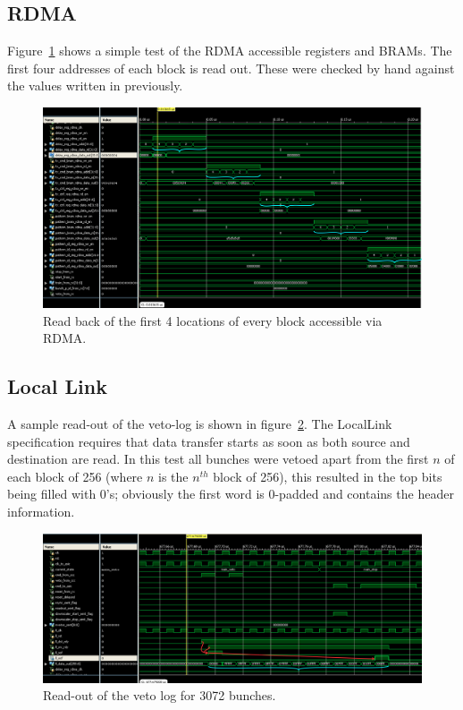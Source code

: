 \subsection{RDMA} %
\label{sec:rdma}
Figure~\ref{fig:isim_rdma} shows a simple test of the RDMA accessible registers and BRAMs. The first four addresses of each block is read out. These were checked by hand against the values written in previously.
\begin{figure}[htbp]
  \centering
  \includegraphics[width=\textwidth]{images/isim/edited/rdma.png}
  \caption{Read back of the first 4 locations of every block accessible via RDMA.}
  \label{fig:isim_rdma}
\end{figure}
    
\subsection{Local Link} %
\label{sec:local_link}
A sample read-out of the veto-log is shown in figure~\ref{fig:isim_locallink}. The LocalLink specification requires that data transfer starts as soon as both source and destination are read. In this test all bunches were vetoed apart from the first \(n\) of each block of 256 (where \( n\) is the \( n^{th} \) block of 256), this resulted in the top bits being filled with 0's; obviously the first word is 0-padded and contains the header information.
\begin{figure}[htbp]
  \centering
  \includegraphics[width=\textwidth]{images/isim/edited/locallink.png}
  \caption{Read-out of the veto log for 3072 bunches.}
  \label{fig:isim_locallink}
\end{figure}
    
